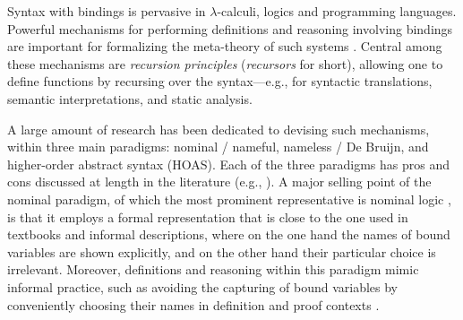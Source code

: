 Syntax with bindings is pervasive in $\lambda$-calculi, logics and programming languages. %
Powerful  
mechanisms for performing definitions and reasoning involving bindings are important for formalizing %
the meta-theory of such systems  \cite{POPLmark,poplmarkReloaded,DBLP:journals/mscs/FeltyMP18}.  
%
Central among these mechanisms are \emph{recursion principles}  (\emph{recursors} for short), allowing one 
to define functions by recursing over the syntax---e.g., %
for syntactic translations, semantic interpretations, and %
static analysis. 
%

A large amount of 
research has been dedicated to devising such mechanisms, within three main paradigms: nominal / nameful, nameless / De Bruijn, and 
higher-order abstract syntax (HOAS). 
%
Each of the three paradigms has pros and cons discussed at length in the literature (e.g., \cite{DBLP:journals/entcs/BerghoferU07,DBLP:conf/tphol/NorrishV07,poplmarkReloaded,momFelty-Hybrid4,DBLP:journals/pacmpl/BlanchetteGPT19}). 
%
A major selling point of the nominal paradigm, of which the most prominent representative is  nominal logic   \cite{DBLP:conf/lics/GabbayP99,UrbanTasson,nominalCoq}, is that it employs a formal representation that is close to the one used in textbooks and informal descriptions, where on the one hand the names of bound variables are shown explicitly, and on the other hand their particular choice is irrelevant. Moreover, definitions and reasoning within this paradigm mimic informal practice,   
such as avoiding the capturing of bound variables by conveniently choosing their names in definition and proof contexts \cite{pitts-AlphaStructural,urban-Barendregt,nominalInAgda}.  %

